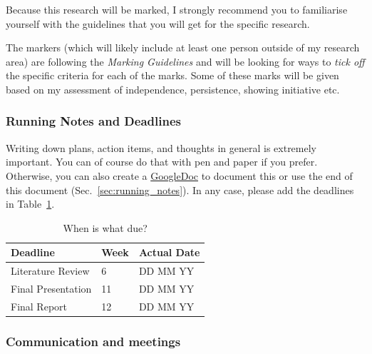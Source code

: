 \documentclass[fleqn,usenatbib]{mnras}
\begin{document}
Because this research will be marked, I strongly recommend you to familiarise yourself with the guidelines that you will get for the specific research.

The markers (which will likely include at least one person outside of my research area) are following the \textit{Marking Guidelines} and will be looking for ways to \textit{tick off} the specific criteria for each of the marks. Some of these marks will be given based on my assessment of independence, persistence, showing initiative etc.

\subsubsection{Running Notes and Deadlines}

Writing down plans, action items, and thoughts in general is extremely important. You can of course do that with pen and paper if you prefer. Otherwise, you can also create a \href{https://docs.google.com}{GoogleDoc} to document this or use the end of this document (Sec.~\ref{sec:running_notes}). In any case, please add the deadlines in Table~\ref{tab:deadlines}.

\begin{table}
	\centering
	\caption{When is what due?}
	\label{tab:deadlines}
	\begin{tabular}{lll} %
		\hline
		Deadline & Week & Actual Date \\
		\hline
		Literature Review     & 6 & DD MM YY\\
		Final Presentation    & 11 & DD MM YY\\
		Final Report          & 12 & DD MM YY\\
		\hline
	\end{tabular}
\end{table}

\subsubsection{Communication and meetings}
\end{document}
